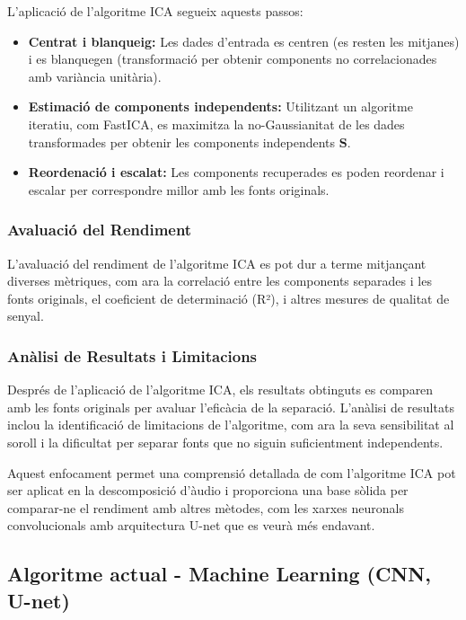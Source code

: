 \documentclass[10pt,a4paper,twocolumn,twoside]{article}
\begin{document}
L'aplicació de l'algoritme ICA segueix aquests passos:

\begin{itemize}
    \item \textbf{Centrat i blanqueig:} Les dades d'entrada es centren (es resten les mitjanes) i es blanquegen (transformació per obtenir components no correlacionades amb variància unitària).
    \item \textbf{Estimació de components independents:} Utilitzant un algoritme iteratiu, com FastICA, es maximitza la no-Gaussianitat de les dades transformades per obtenir les components independents $\mathbf{S}$.
    \item \textbf{Reordenació i escalat:} Les components recuperades es poden reordenar i escalar per correspondre millor amb les fonts originals.
\end{itemize}

\subsubsection{Avaluació del Rendiment}

L'avaluació del rendiment de l'algoritme ICA es pot dur a terme mitjançant diverses mètriques, com ara la correlació entre les components separades i les fonts originals, el coeficient de determinació (R²), i altres mesures de qualitat de senyal.

\subsubsection{Anàlisi de Resultats i Limitacions}

Després de l'aplicació de l'algoritme ICA, els resultats obtinguts es comparen amb les fonts originals per avaluar l'eficàcia de la separació. L'anàlisi de resultats inclou la identificació de limitacions de l'algoritme, com ara la seva sensibilitat al soroll i la dificultat per separar fonts que no siguin suficientment independents.

Aquest enfocament permet una comprensió detallada de com l'algoritme ICA pot ser aplicat en la descomposició d'àudio i proporciona una base sòlida per comparar-ne el rendiment amb altres mètodes, com les xarxes neuronals convolucionals amb arquitectura U-net que es veurà més endavant.

\subsection{Algoritme actual - Machine Learning (CNN, U-net)}
\end{document}
